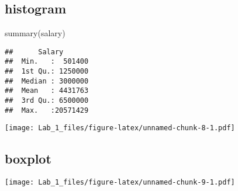 \documentclass[
]{article}
\newenvironment{Shaded}{\begin{snugshade}}{\end{snugshade}}
\newcommand{\AttributeTok}[1]{\textcolor[rgb]{0.77,0.63,0.00}{#1}}
\newcommand{\ConstantTok}[1]{\textcolor[rgb]{0.00,0.00,0.00}{#1}}
\newcommand{\FunctionTok}[1]{\textcolor[rgb]{0.00,0.00,0.00}{#1}}
\newcommand{\NormalTok}[1]{#1}
\newcommand{\SpecialCharTok}[1]{\textcolor[rgb]{0.00,0.00,0.00}{#1}}
\newcommand{\StringTok}[1]{\textcolor[rgb]{0.31,0.60,0.02}{#1}}
\begin{document}
\hypertarget{histogram}{%
\subsection{histogram}\label{histogram}}

\begin{Shaded}
\begin{Highlighting}[]
\FunctionTok{summary}\NormalTok{(salary)}
\end{Highlighting}
\end{Shaded}

\begin{verbatim}
##      Salary        
##  Min.   :  501400  
##  1st Qu.: 1250000  
##  Median : 3000000  
##  Mean   : 4431763  
##  3rd Qu.: 6500000  
##  Max.   :20571429
\end{verbatim}

\begin{Shaded}
\end{Shaded}

\texttt{[image: Lab\_1\_files/figure-latex/unnamed-chunk-8-1.pdf]}

\hypertarget{boxplot}{%
\subsection{boxplot}\label{boxplot}}

\begin{Shaded}
\end{Shaded}

\texttt{[image: Lab\_1\_files/figure-latex/unnamed-chunk-9-1.pdf]}
\end{document}
